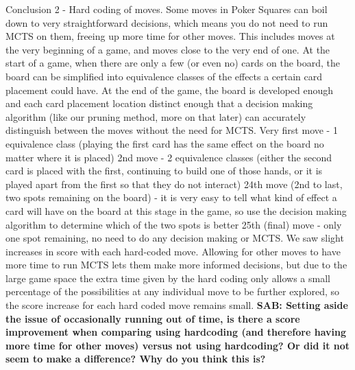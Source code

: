 \documentclass[letterpaper]{article}
\begin{document}
Conclusion 2 - Hard coding of moves. Some moves in Poker Squares can boil down to very straightforward decisions, which means you do not need to run MCTS on them, freeing up more time for other moves. This includes moves at the very beginning of a game, and moves close to the very end of one. At the start of a game, when there are only a few (or even no) cards on the board, the board can be simplified into equivalence classes of the effects a certain card placement could have. At the end of the game, the board is developed enough and each card placement location distinct enough that a decision making algorithm (like our pruning method, more on that later) can accurately distinguish between the moves without the need for MCTS.
	Very first move - 1 equivalence class (playing the first card has the same effect on the board no matter where it is placed)
	2nd move - 2 equivalence classes (either the second card is placed with the first, continuing to build one of those hands, or it is played apart from the first so that they do not interact)
	24th move (2nd to last, two spots remaining on the board) - it is very easy to tell what kind of effect a card will have on the board at this stage in the game, so use the decision making algorithm to determine which of the two spots is better
	25th (final) move - only one spot remaining, no need to do any decision making or MCTS.
We saw slight increases in score with each hard-coded move. Allowing for other moves to have more time to run MCTS lets them make more informed decisions, but due to the large game space the extra time given by the hard coding only allows a small percentage of the possibilities at any individual move to be further explored, so the score increase for each hard coded move remains small.
{\bf SAB: Setting aside the issue of occasionally running out of time, is there a score improvement when comparing using hardcoding (and therefore having more time for other moves) versus not using hardcoding? Or did it not seem to make a difference? Why do you think this is?}
\end{document}

